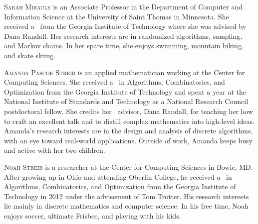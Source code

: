 \documentclass{toc}
\begin{document}
%
%
%
%
%
%
%
%
%
%
%
%
%
%
%
%
%
%
%
%
\begin{tocaboutauthors}
\begin{tocabout}[miracle]
\textsc{Sarah Miracle} is an Associate Professor in the Department of Computer and Information Science at the University of Saint Thomas in Minnesota.  She received
a \phd\ from the Georgia Institute of Technology where she was advised by Dana Randall.
Her research interests are in randomized algorithms, sampling, and Markov chains.  In her spare time, she enjoys swimming, mountain biking, and skate skiing.
\end{tocabout}
%
\begin{tocabout}[streibA]  %
  \textsc{Amanda Pascoe Streib} is an applied mathematician working at the Center for Computing Sciences.  She received a \phd\ in Algorithms, Combinatorics, and Optimization from the Georgia Institute of Technology and spent a year at the National Institute of Standards and Technology as a National Research Council postdoctoral fellow.  She credits her \phd\ advisor, Dana Randall, for teaching her how to craft an excellent talk and to distill complex mathematics into high-level ideas.  Amanda's research interests are in the design and analysis of discrete algorithms, with an eye toward real-world applications.  Outside of work, Amanda keeps busy and active with her two children.
\end{tocabout}
%
\begin{tocabout}[streibB]  %
  \textsc{Noah Streib} is a researcher at the Center for Computing Sciences in Bowie, MD.  After growing up in Ohio and attending Oberlin College, he received a \phd\ in Algorithms, Combinatorics, and Optimization from the Georgia Institute of Technology in 2012 under the advisement of Tom Trotter.  His research interests lie mainly in discrete
%
mathematics  %
and computer science.  In his free time, Noah enjoys soccer, ultimate Frisbee, and playing with his kids.
\end{tocabout}
\end{tocaboutauthors}
\end{document}
